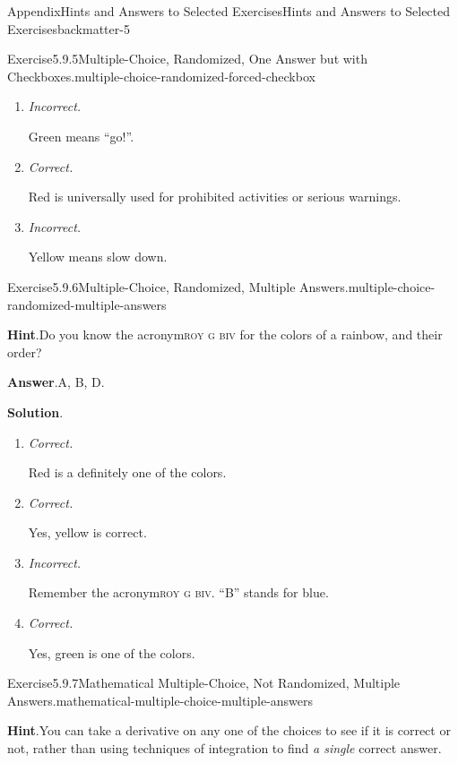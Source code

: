 \documentclass[oneside,10pt,]{book}
\newcommand{\blocktitlefont}{\relax}
\newcommand{\acronym}[1]{\textsc{\MakeLowercase{#1}}}
\newcommand{\lititle}[1]{{\slshape#1}}
\numberwithin{equation}{section}
\begin{document}
\begin{solutions-chapter}{Appendix}{Hints and Answers to Selected Exercises}{}{Hints and Answers to Selected Exercises}{}{}{backmatter-5}
\begin{divisionsolution}{Exercise}{5.9.5}{Multiple-Choice, Randomized, One Answer but with Checkboxes.}{multiple-choice-randomized-forced-checkbox}
\begin{enumerate}[label={\Alph*.}]
\item{}\lititle{Incorrect.}\par%
Green means ``go!''.%
\item{}\lititle{Correct.}\par%
Red is universally used for prohibited activities or serious warnings.%
\item{}\lititle{Incorrect.}\par%
Yellow means slow down.%
\end{enumerate}
%
\end{divisionsolution}%
\begin{divisionsolution}{Exercise}{5.9.6}{Multiple-Choice, Randomized, Multiple Answers.}{multiple-choice-randomized-multiple-answers}%
\par\smallskip%
\noindent\textbf{\blocktitlefont Hint}.\hypertarget{multiple-choice-randomized-multiple-answers-4-back}{}\quad{}Do you know the acronym\textellipsis{}\acronym{ROY G BIV} for the colors of a rainbow, and their order?%
\par\smallskip%
\noindent\textbf{\blocktitlefont Answer}.\hypertarget{multiple-choice-randomized-multiple-answers-5-back}{}\quad{}A, B, D.%
\par\smallskip%
\noindent\textbf{\blocktitlefont Solution}.\hypertarget{multiple-choice-randomized-multiple-answers-6-back}{}\quad{}%
\begin{enumerate}[label={\Alph*.}]
\item{}\lititle{Correct.}\par%
Red is a definitely one of the colors.%
\item{}\lititle{Correct.}\par%
Yes, yellow is correct.%
\item{}\lititle{Incorrect.}\par%
Remember the acronym\textellipsis{}\acronym{ROY G BIV}.  ``B'' stands for blue.%
\item{}\lititle{Correct.}\par%
Yes, green is one of the colors.%
\end{enumerate}
%
\end{divisionsolution}%
\begin{divisionsolution}{Exercise}{5.9.7}{Mathematical Multiple-Choice, Not Randomized, Multiple Answers.}{mathematical-multiple-choice-multiple-answers}%
\par\smallskip%
\noindent\textbf{\blocktitlefont Hint}.\hypertarget{mathematical-multiple-choice-multiple-answers-4-back}{}\quad{}You can take a derivative on any one of the choices to see if it is correct or not, rather than using techniques of integration to find \emph{a single} correct answer.%

\end{divisionsolution}
\end{solutions-chapter}
\end{document}
